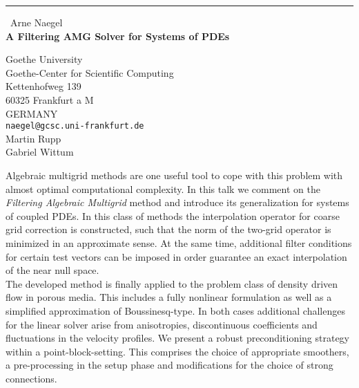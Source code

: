 \documentclass{report}
\begin{document}
\begin{center}
\rule{6in}{1pt} \
{\large Arne Naegel \\
{\bf A Filtering AMG Solver for Systems of PDEs}}

Goethe University \\ Goethe-Center for Scientific Computing \\ Kettenhofweg 139 \\ 60325 Frankfurt a M \\ GERMANY
\\
{\tt naegel@gcsc.uni-frankfurt.de}\\
Martin Rupp\\
Gabriel Wittum\end{center}

Algebraic multigrid methods are one useful tool to cope with this problem
with almost optimal computational complexity. In this talk we comment on
the {\it Filtering Algebraic Multigrid} method and introduce its
generalization for systems of coupled PDEs. In this class of methods the
interpolation operator for coarse grid correction is constructed, such
that the norm of the two-grid operator is minimized in an approximate
sense. At the same time, additional filter conditions for certain test
vectors can be imposed in order guarantee an exact interpolation of the
near null space.\\

The developed method is finally applied to the problem class of density
driven flow in porous media. This includes a fully nonlinear formulation
as well as a simplified approximation of Boussinesq-type. In both cases
additional challenges for the linear solver arise from anisotropies,
discontinuous coefficients and fluctuations in the velocity profiles. We
present a robust preconditioning strategy within a point-block-setting.
This comprises the choice of appropriate smoothers, a pre-processing in
the setup phase and modifications for the choice of strong connections.
\end{document}
